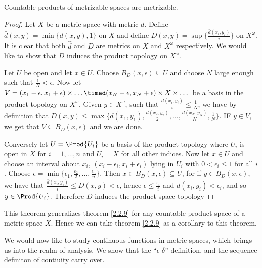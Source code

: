 \begin{theorem}\label{2.3.3}
    Countable products of metrizable spaces are metrizable.
\end{theorem}
\begin{proof}
    Let $X$ be a metric space with metric  $d$. Define
    $\bar{d}(x,y)=\min\{d(x,y),1\}$ on $X$ and define  $D(x,y)=\sup\{\frac{\bar{d}(x_i,y_i)}{i}\}$
    on $X^{\omega}$. It is clear that both $\hat{d}$ and $D$ are metrics on  $X$ and  $X^{\omega}$
    respectively. We would like to show that $D$ induces the product topology on  $X^{\omega}$.

    Let $U$ be open and let  $x \in U$. Choose  $B_D(x,\epsilon) \subseteq U$ and choose $N$ large
    enough such that  $ \frac{1}{N}<\epsilon$. Now let $V=(x_1-\epsilon,x_1+\epsilon) \times \dots
    \timed (x_N-\epsilon,x_N+\epsilon) \times X \times \dots$ be a basis in the product topology on
    $X^{\omega}$. Given $y \in X^{\omega}$, such that $\frac{\bar{d}(x_i,y_i)}{i} \leq
    \frac{1}{N}$, we have by definition that $D(x,y) \leq \max\{\bar{d}(x_1,y_1),
    \frac{\bar{d}(x_2,y_2)}{2}, \dots, \frac{\bar{d}(x_N,y_N)}{N}, \frac{1}{N}\}$. IF $y \in V$, we
    get that  $V \subseteq B_D(x,\epsilon)$ and we are done.

    Conversely let $U=\Prod{U_i}$ be a basis of the product topology where $U_i$ is open in  $X$
    for  $i=1,\dots,n$ and  $U_i=X$ for all other indices. Now let  $x \in U$ and choose an interval
    about  $x_i$,  $(x_i-\epsilon_i,x_i+\epsilon_i)$ lying in $U_i$ with  $0<\epsilon_i \leq 1$ for
    all  $i$. Choose  $\epsilon=\min\{\epsilon_1,\frac{\epsilon_2}{2}, \dots,
    \frac{\epsilon_n}{n}\}$. Then  $x \in B_D(x,\epsilon) \subseteq U$, for if $y \in
    B_D(x,\epsilon)$, we have that $\frac{\bar{d}(x_i,y_i)}{i} \leq D(x,y)<\epsilon$, hence
    $\epsilon \leq \frac{\epsilon_i}{i}$ and $d(x_i,y_i)<\epsilon_i$, and so $y \in \Prod{U_i}$.
    Therefore $D$ induces the product space topology
\end{proof}
\begin{remark} 
    This theorem generalizes theorem \ref{2.2.9} for any countable product space of a metric space
    $X$. Hence we can take theorem \ref {2.2.9} as a corollary to this theorem.		
\end{remark}

We would now like to study continuous functions in metric spaces, which brings us into the realm of
analysis. We show that the ``$\epsilon$-$\delta$'' definition, and the sequence definiton of
contiuity carry over.

